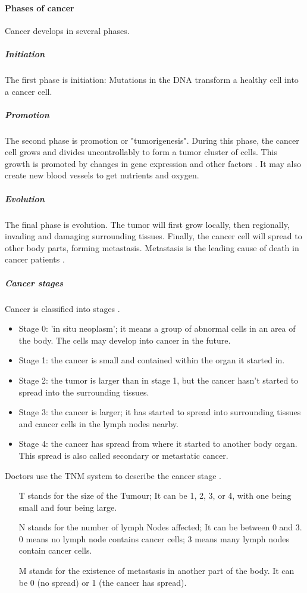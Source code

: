 \paragraph{Phases of cancer}
Cancer develops in several phases.
\subparagraph{Initiation}
The first phase is initiation: 
Mutations in the DNA transform a healthy cell into a cancer cell.
\subparagraph{Promotion}
The second phase is promotion or "tumorigenesis".
During this phase, the cancer cell grows and divides uncontrollably to form a tumor cluster of cells.
This growth is promoted by changes in gene expression and other factors \cite{Witsch2010}.
It may also create new blood vessels to get nutrients and oxygen.
\subparagraph{Evolution}
The final phase is evolution.
The tumor will first grow locally, then regionally, invading and damaging surrounding tissues.
Finally, the cancer cell will spread to other body parts, forming metastasis.
Metastasis is the leading cause of death in cancer patients \cite{Steeg2006}.

\subparagraph{Cancer stages}
Cancer is classified into stages \cite{cancerresearchuk2023}.
\begin{itemize}
	\item Stage 0: 'in situ neoplasm'; it means a group of abnormal cells in an area of the body. The cells may develop into cancer in the future.
	\item Stage 1: the cancer is small and contained within the organ it started in.
	\item Stage 2: the tumor is larger than in stage 1, but the cancer hasn't started to spread into the surrounding tissues.
	\item Stage 3: the cancer is larger; it has started to spread into surrounding tissues and cancer cells in the lymph nodes nearby.
	\item Stage 4: the cancer has spread from where it started to another body organ. This spread is also called secondary or metastatic cancer.
\end{itemize}
Doctors use the TNM system to describe the cancer stage \cite{Brierley2016}.
\begin{itemize}
	\item [T] stands for the size of the Tumour;
	It can be 1, 2, 3, or 4, with one being small and four being large.
	\item [N] stands for the number of lymph Nodes affected;
	It can be between 0 and 3.
	0 means no lymph node contains cancer cells; 3 means many lymph nodes contain cancer cells.
	\item [M] stands for the existence of metastasis in another part of the body.
	It can be 0 (no spread) or 1 (the cancer has spread).
\end{itemize}

